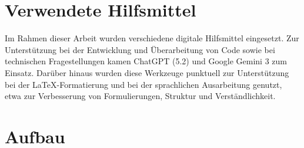 \section{Verwendete Hilfsmittel}

Im Rahmen dieser Arbeit wurden verschiedene digitale Hilfsmittel eingesetzt. Zur Unterstützung bei der Entwicklung und Überarbeitung von Code sowie bei technischen Fragestellungen kamen ChatGPT (5.2) und Google Gemini 3 zum Einsatz. Darüber hinaus wurden diese Werkzeuge punktuell zur Unterstützung bei der LaTeX-Formatierung und bei der sprachlichen Ausarbeitung genutzt, etwa zur Verbesserung von Formulierungen, Struktur und Verständlichkeit.

\clearpage

\section{Aufbau}

